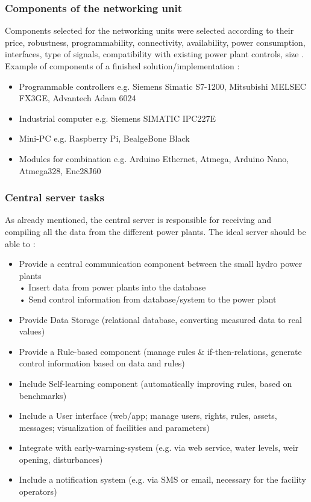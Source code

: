 \subsubsection{Components of the networking unit}
Components selected for the networking units were selected according to their price, robustness, programmability, connectivity, availability, power consumption, interfaces, type of signals, compatibility with existing power plant controls, size \cite{SEIT2017}. Example of components of a finished solution/implementation \cite{SEIT2017}:
\begin{itemize}
	\item Programmable controllers e.g. Siemens Simatic S7-1200, Mitsubishi MELSEC FX3GE, Advantech Adam 6024
	\item Industrial computer e.g. Siemens SIMATIC IPC227E
	\item Mini-PC e.g. Raspberry Pi, BealgeBone Black
	\item Modules for combination e.g. Arduino Ethernet, Atmega, Arduino Nano, Atmega328, Enc28J60
\end{itemize}
\subsubsection{Central server tasks}
As already mentioned, the central server is responsible for receiving and compiling all the data from the different power plants. The ideal server should be able to \cite{SEIT2017}:
\begin{itemize}
	\item Provide a central communication component between the small hydro power plants\\
		\indent • Insert data from power plants into the database\\
		\indent • Send control information from database/system to the power plant
	\item Provide Data Storage (relational database, converting measured data to real values)
	\item Provide a Rule-based component (manage rules \& if-then-relations, generate control information based on data and rules)
	\item Include Self-learning component (automatically improving rules, based on benchmarks)
	\item Include a User interface (web/app; manage users, rights, rules, assets, messages; visualization of facilities and parameters)
	\item Integrate with early-warning-system (e.g. via web service, water levels, weir opening, disturbances)
	\item Include a notification system (e.g. via SMS or email, necessary for the facility operators)
\end{itemize}
